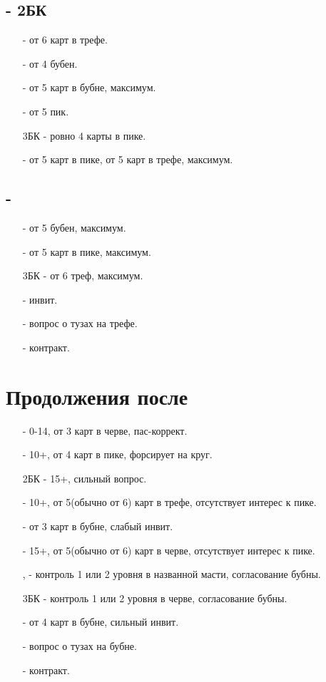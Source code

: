 \documentclass{article}
\begin{document}
\subsection{ - 2БК}
\begin{enumerate}
    \item[\cl{3}] - от 6 карт в трефе.
    \item[\di{3}] - от 4 бубен.
    \item[\he{3}] - от 5 карт в бубне, максимум.
    \item[\sp{3}] - от 5 пик.
    \item[3БК] - ровно 4 карты в пике.
    \item[\cl{4}] - от 5 карт в пике, от 5 карт в трефе, максимум.
\end{enumerate}
\subsection{ - }
\begin{enumerate}
    \item[\di{3}] - от 5 бубен, максимум.
    \item[\sp{3}] - от 5 карт в пике, максимум.
    \item[3БК] - от 6 треф, максимум.
    \item[\cl{4}] - инвит.
    \item[\di{4}] - вопрос о тузах на трефе.
    \item[\cl{5}] - контракт.
\end{enumerate}
\section{Продолжения после }
\begin{enumerate}
    \item[\he{2}] - 0-14, от 3 карт в черве, пас-коррект.
    \item[\sp{2}] - 10+, от 4 карт в пике, форсирует на круг.
    \item[2БК] - 15+, сильный вопрос.
    \item[\cl{3}] - 10+, от 5(обычно от 6) карт в трефе, отсутствует интерес к пике. 
    \item[\di{3}] - от 3 карт в бубне, слабый инвит.
    \item[\he{3}] - 15+, от 5(обычно от 6) карт в черве, отсутствует интерес к пике. 
    \item[\sp{3}, \cl{4}] - контроль 1 или 2 уровня в названной масти, согласование бубны.
    \item[3БК] - контроль 1 или 2 уровня в черве, согласование бубны.
    \item[\di{4}] - от 4 карт в бубне, сильный инвит.
    \item[\he{4}] - вопрос о тузах на бубне.
    \item[\di{5}] - контракт.
\end{enumerate}
\end{document}
